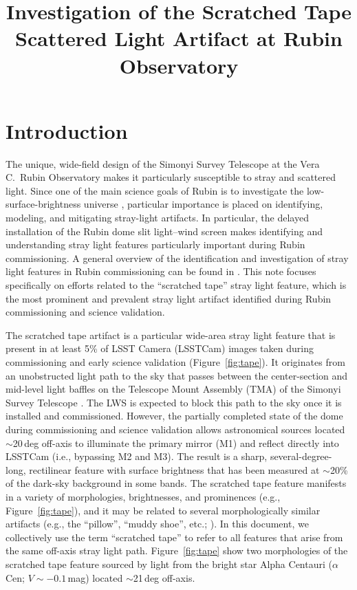 \documentclass[SE,authoryear,toc]{lsstdoc}
\title{Investigation of the Scratched Tape Scattered Light Artifact at Rubin Observatory}
\date{\vcsDate}
\begin{document}
\maketitle


\section{Introduction}
\label{sec:introduction}

The unique, wide-field design of the Simonyi Survey Telescope at the Vera C.\ Rubin Observatory makes it particularly susceptible to stray and scattered light. Since one of the main science goals of Rubin is to investigate the low-surface-brightness universe \citep{2019ApJ...873..111I}, particular importance is placed on identifying, modeling, and mitigating stray-light artifacts. In particular, the delayed installation of the Rubin dome slit light--wind screen \citep[LWS;][]{Marchiori:2024} makes identifying and understanding stray light features particularly important during Rubin commissioning. A general overview of the identification and investigation of stray light features in Rubin commissioning can be found in \citet{SITCOMTN-160}. This note focuses specifically on efforts related to the ``scratched tape'' stray light feature, which is the most prominent and prevalent stray light artifact identified during Rubin commissioning and science validation.

The scratched tape artifact is a particular wide-area stray light feature that is present in at least 5\% of LSST Camera (LSSTCam) images taken during commissioning and early science validation (Figure~\ref{fig:tape}). It originates from an unobstructed light path to the sky that passes between the center-section and mid-level light baffles on the Telescope Mount Assembly (TMA) of the Simonyi Survey Telescope \citep{2022SPIE12182E..0WT}. The LWS is expected to block this path to the sky once it is installed and commissioned.  However, the partially completed state of the dome during commissioning and science validation allows astronomical sources located $\sim$20\,deg off-axis to illuminate the primary mirror (M1) and reflect directly into LSSTCam (i.e., bypassing M2 and M3). The result is a sharp, several-degree-long, rectilinear feature with surface brightness that has been measured at $\sim$20\% of the dark-sky background in some bands.
The scratched tape feature manifests in a variety of morphologies, brightnesses, and prominences (e.g., Figure~\ref{fig:tape}), and it may be related to several morphologically similar artifacts (e.g., the ``pillow'', ``muddy shoe'', etc.; \citealt{SITCOMTN-160}). In this document, we collectively use the term ``scratched tape'' to refer to all features that arise from the same off-axis stray light path.
Figure~\ref{fig:tape} show two morphologies of the scratched tape feature sourced by light from the bright star Alpha Centauri ($\alpha$Cen; $V \sim -0.1$\,mag) located $\sim$21\,deg off-axis.
\end{document}
